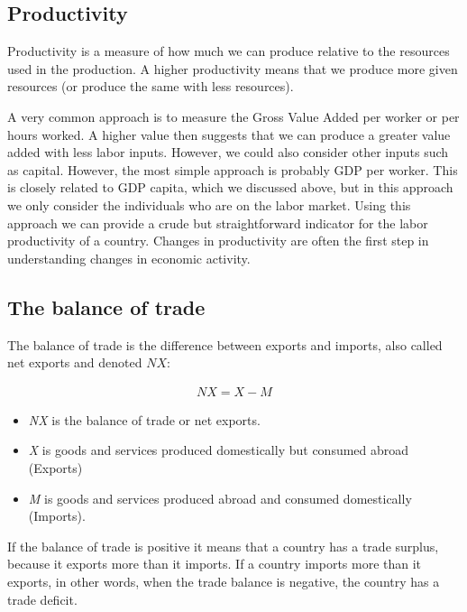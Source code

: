 \documentclass[]{book}
\providecommand{\tightlist}{%
  \setlength{\itemsep}{0pt}\setlength{\parskip}{0pt}}
\begin{document}
\hypertarget{productivity}{%
\subsection{Productivity}\label{productivity}}

Productivity is a measure of how much we can produce relative to the resources used in the production. A higher productivity means that we produce more given resources (or produce the same with less resources).

A very common approach is to measure the Gross Value Added per worker or per hours worked. A higher value then suggests that we can produce a greater value added with less labor inputs. However, we could also consider other inputs such as capital. However, the most simple approach is probably GDP per worker. This is closely related to GDP capita, which we discussed above, but in this approach we only consider the individuals who are on the labor market. Using this approach we can provide a crude but straightforward indicator for the labor productivity of a country. Changes in productivity are often the first step in understanding changes in economic activity.

\hypertarget{the-balance-of-trade}{%
\subsection{The balance of trade}\label{the-balance-of-trade}}

The balance of trade is the difference between exports and imports, also called net exports and denoted \(NX\):

\begin{align}
  NX=X-M
\end{align}

\begin{itemize}
\tightlist
\item
  \emph{NX} is the balance of trade or net exports.
\item
  \emph{X} is goods and services produced domestically but consumed abroad (Exports)
\item
  \emph{M} is goods and services produced abroad and consumed domestically (Imports).
\end{itemize}

If the balance of trade is positive it means that a country has a trade surplus, because it exports more than it imports. If a country imports more than it exports, in other words, when the trade balance is negative, the country has a trade deficit.
\end{document}
